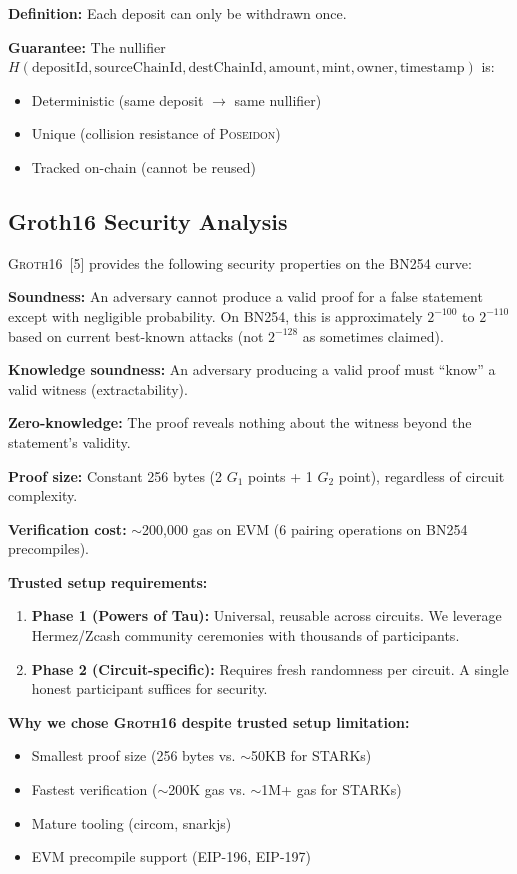 \documentclass[11pt,a4paper,twoside]{article}
\newcommand{\poseidon}{\textsc{Poseidon}}
\newcommand{\groth}{\textsc{Groth16}}
\begin{document}
\textbf{Definition:} Each deposit can only be withdrawn once.

\textbf{Guarantee:} The nullifier $H(\text{depositId}, \text{sourceChainId}, \text{destChainId}, \text{amount}, \text{mint}, \text{owner}, \text{timestamp})$ is:
\begin{itemize}
    \item Deterministic (same deposit $\rightarrow$ same nullifier)
    \item Unique (collision resistance of \poseidon{})
    \item Tracked on-chain (cannot be reused)
\end{itemize}

\subsection{Groth16 Security Analysis}

\groth{}~[5] provides the following security properties on the BN254 curve:

\textbf{Soundness:} An adversary cannot produce a valid proof for a false statement except with negligible probability. On BN254, this is approximately $2^{-100}$ to $2^{-110}$ based on current best-known attacks (not $2^{-128}$ as sometimes claimed).

\textbf{Knowledge soundness:} An adversary producing a valid proof must ``know'' a valid witness (extractability).

\textbf{Zero-knowledge:} The proof reveals nothing about the witness beyond the statement's validity.

\textbf{Proof size:} Constant 256 bytes (2 $G_1$ points + 1 $G_2$ point), regardless of circuit complexity.

\textbf{Verification cost:} $\sim$200,000 gas on EVM (6 pairing operations on BN254 precompiles).

\textbf{Trusted setup requirements:}
\begin{enumerate}
    \item \textbf{Phase 1 (Powers of Tau):} Universal, reusable across circuits. We leverage Hermez/Zcash community ceremonies with thousands of participants.
    \item \textbf{Phase 2 (Circuit-specific):} Requires fresh randomness per circuit. A single honest participant suffices for security.
\end{enumerate}

\textbf{Why we chose \groth{} despite trusted setup limitation:}
\begin{itemize}
    \item Smallest proof size (256 bytes vs. $\sim$50KB for STARKs)
    \item Fastest verification ($\sim$200K gas vs. $\sim$1M+ gas for STARKs)
    \item Mature tooling (circom, snarkjs)
    \item EVM precompile support (EIP-196, EIP-197)
\end{itemize}
\end{document}
